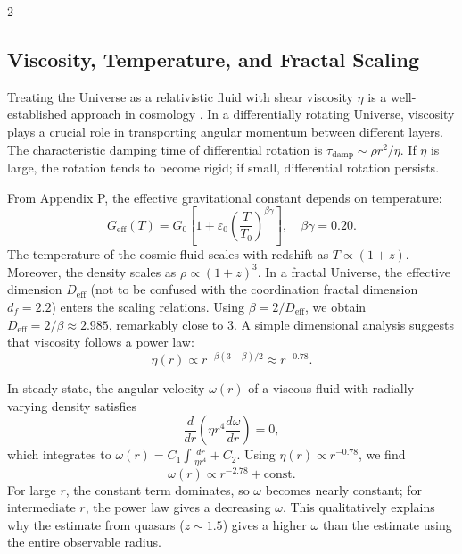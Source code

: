 \documentclass[12pt,a4paper]{article}
\begin{document}
\begin{multicols}{2}
		\subsection{Viscosity, Temperature, and Fractal Scaling}
		
		Treating the Universe as a relativistic fluid with shear viscosity \(\eta\) is a well-established approach in cosmology \cite{Giovannini2005}. In a differentially rotating Universe, viscosity plays a crucial role in transporting angular momentum between different layers. The characteristic damping time of differential rotation is \(\tau_{\mathrm{damp}} \sim \rho r^2 / \eta\). If \(\eta\) is large, the rotation tends to become rigid; if small, differential rotation persists.
		
		From Appendix P, the effective gravitational constant depends on temperature:
		\begin{equation}
			G_{\mathrm{eff}}(T) = G_0\left[1 + \varepsilon_0\left(\frac{T}{T_0}\right)^{\beta\gamma}\right], \quad \beta\gamma = 0.20.
		\end{equation}
		The temperature of the cosmic fluid scales with redshift as \(T \propto (1+z)\). Moreover, the density scales as \(\rho \propto (1+z)^3\). In a fractal Universe, the effective dimension \(D_{\mathrm{eff}}\) (not to be confused with the coordination fractal dimension \(d_f = 2.2\)) enters the scaling relations. Using \(\beta = 2/D_{\mathrm{eff}}\), we obtain \(D_{\mathrm{eff}} = 2/\beta \approx 2.985\), remarkably close to 3. A simple dimensional analysis suggests that viscosity follows a power law:
		\begin{equation}
			\eta(r) \propto r^{-\beta(3-\beta)/2} \approx r^{-0.78}.
		\end{equation}
		
		In steady state, the angular velocity \(\omega(r)\) of a viscous fluid with radially varying density satisfies
		\begin{equation}
			\frac{d}{dr}\left( \eta r^4 \frac{d\omega}{dr} \right) = 0,
		\end{equation}
		which integrates to \(\omega(r) = C_1 \int \frac{dr}{\eta r^4} + C_2\). Using \(\eta(r) \propto r^{-0.78}\), we find
		\begin{equation}
			\omega(r) \propto r^{-2.78} + \text{const}.
		\end{equation}
		For large \(r\), the constant term dominates, so \(\omega\) becomes nearly constant; for intermediate \(r\), the power law gives a decreasing \(\omega\). This qualitatively explains why the estimate from quasars (\(z\sim1.5\)) gives a higher \(\omega\) than the estimate using the entire observable radius.
		

\end{multicols}
\end{document}
